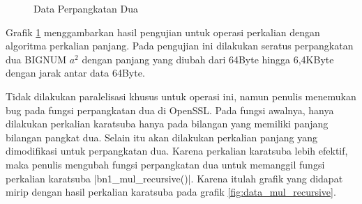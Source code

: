     \begin{figure}[h]
      \centering
      \caption{Data Perpangkatan Dua}
      \label{fig:data_sqr}
    \end{figure}

    Grafik \ref{fig:data_sqr} menggambarkan hasil pengujian untuk operasi perkalian dengan algoritma perkalian panjang. Pada pengujian ini dilakukan seratus perpangkatan dua BIGNUM $a^2$ dengan panjang yang diubah dari 64Byte hingga 6,4KByte dengan jarak antar data 64Byte.

    Tidak dilakukan paralelisasi khusus untuk operasi ini, namun penulis menemukan bug pada fungsi perpangkatan dua di OpenSSL. Pada fungsi awalnya, hanya dilakukan perkalian karatsuba hanya pada bilangan yang memiliki panjang bilangan pangkat dua. Selain itu akan dilakukan perkalian panjang yang dimodifikasi untuk perpangkatan dua. Karena perkalian karatsuba lebih efektif, maka penulis mengubah fungsi perpangkatan dua untuk memanggil fungsi perkalian karatsuba |bn1_mul_recursive()|. Karena itulah grafik yang didapat mirip dengan hasil perkalian karatsuba pada grafik \ref{fig:data_mul_recursive}.

